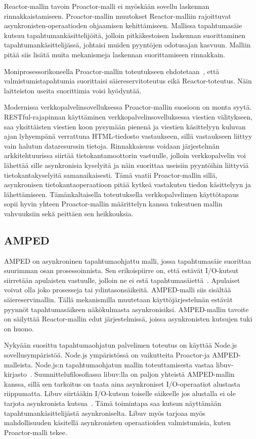 \documentclass[finnish]{tktltiki2}%
\theoremstyle{definition}
\theoremstyle{remark}
\begin{document}
Reactor-mallin tavoin Proactor-malli ei myöskään sovellu laskennan rinnakkaistamiseen.
Proactor-mallin muutokset Reactor-malliin rajoittuvat
asynkronisten-operaatioden ohjaamisen
kehittämiseen. Mallissa tapahtumasäie kutsuu tapahtumankäsittelijöitä, jolloin
pitkäkestoisen laskennan suorittaminen tapahtumankäsittelijässä, johtaisi
muiden pyyntöjen odotusajan kasvuun. Malliin pitää siis
lisätä muita mekanismeja laskennan suorittamiseen rinnakkain.

Moniprosessorikoneella Proactor-mallin toteutukseen
ehdotetaan~\cite{pyarali_proactor_1997}, että valmistumistapahtumia suorittaisi
säiereservitoteutus
eikä Reactor-toteutus. Näin laitteiston useita suorittimia voisi hyödyntää.

Modernissa verkkopalvelinsovelluksessa Proactor-mallin suosioon on
monta syytä. RESTful-rajapinnan käyttäminen
verkkopalvelinsovelluksessa viestien välitykseen,
saa yksittäisten viestien koon pysymään pienenä ja viestien
käsittelyyn kuluvan ajan lyhyempänä verrattuna
HTML-tiedosto vastaukseen, sillä
vastaukseen liittyy vain halutun dataresurssin tietoja.
Rinnakkaisuus
voidaan järjestelmän arkkitehtuurissa siirtää tietokantamoottorin vastuulle,
jolloin verkkopalvelin voi lähettää sille asynkronisia kyselyitä
ja näin suorittaa useisiin pyyntöihin liittyviä tietokantakyselyitä
samanaikaisesti. Tämä vaatii Proactor-mallin sillä, asynkronisen tietokantaoperaatioon
pitää kytkeä vastakutsu tiedon käsittelyyn ja lähettämiseen.
Tämänkaltaisella toteutuksella verkkopalvelimen käyttötapaus sopii
hyvin yhteen Proactor-mallin määrittelyn kanssa tukeutuen
mallin vahvuuksiin sekä peittäen sen heikkouksia.

\subsection{AMPED}

AMPED on asynkroninen tapahtumaohjattu malli, jossa
tapahtumasäie suorittaa suurimman osan prosessoinnista. 
Sen erikoispiirre on, että estävät I/O-kutsut
siirretään apulaisten vastuulle, jolloin
ne ei estä tapahtumasäiettä~\cite{pai_flash_1999}. Apulaiset voivat
olla joko prosesseja tai ydintasonsäikeitä.
AMPED-malli siis sisältää säiereservimallin.
Tällä mekanismilla muutetaan käyttöjärjestelmän
estävät pyynnöt tapahtumasäikeen näkökulmasta
asynkronisiksi.
AMPED-mallin tavoite~\cite{pai_flash_1999} on säilyttää Reactor-mallin
edut järjestelmissä, joissa asynkronisten
kutsujen tuki on huono.

Nykyään suosittu tapahtumaohjatun palvelimen toteutus on
käyttää Node.js sovellusympäristöä. Node.js ympäristössä
on vaikutteita Proactor-ja AMPED-malleista.
Node.js:n tapahtumaohjatun mallin toteuttamisesta vastaa
libuv-kirjasto~\cite{libuv_design_2019}. Suunnittelufilosofiassa
libuv:lla on paljon yhteistä AMPED-mallin kanssa, sillä
sen tarkoitus on taata aina asynkroniset I/O-operaatiot alustasta
riippumatta. Libuv siirtääkin I/O-kutsun toiselle säikeelle
jos alustalla ei ole tarjota asynkronista kutsua~\cite{libuv_design_2019}.
Tämä toimintapa saa kutsun näyttämään tapahtumankäsittelijästä
asynkroniselta. Libuv myös tarjoaa myös mahdollisuuden
käsitellä asynkronisten operaatioiden valmistumisia, kuten 
Proactor-malli tekee.
\end{document}
